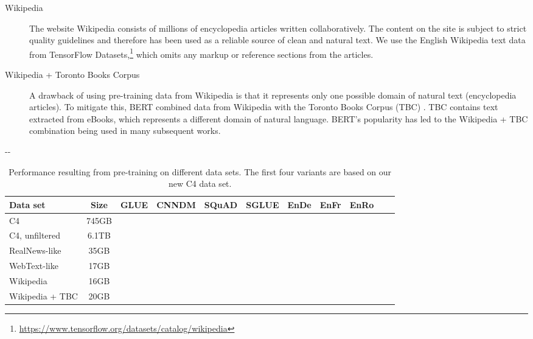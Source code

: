 \documentclass[twoside,11pt]{article}
\newlength{\offsetpage}
\newenvironment{widepage}{\begin{adjustwidth}{-\offsetpage}{-\offsetpage}\addtolength{\textwidth}{2\offsetpage}}{\end{adjustwidth}}
\newcommand{\bsl}{\makebox[0pt][r]{\raisebox{0.05em}{}}}
\begin{document}
\begin{description}
\item[Wikipedia] The website Wikipedia consists of millions of encyclopedia articles written collaboratively.
The content on the site is subject to strict quality guidelines and therefore has been used as a reliable source of clean and natural text.
We use the English Wikipedia text data from TensorFlow Datasets,\footnote{\url{https://www.tensorflow.org/datasets/catalog/wikipedia}} which omits any markup or reference sections from the articles.

\item[Wikipedia + Toronto Books Corpus] A drawback of using pre-training data from Wikipedia is that it represents only one possible domain of natural text (encyclopedia articles).
To mitigate this, BERT \citep{devlin2018bert} combined data from Wikipedia with the Toronto Books Corpus (TBC) \citep{zhu2015aligning}.
TBC contains text extracted from eBooks, which represents a different domain of natural language.
BERT's popularity has led to the Wikipedia + TBC combination being used in many subsequent works.

\end{description}

\begin{table}
\footnotesize
\begin{widepage}
\centering
\begin{tabular}{l c c c c c c c c c c}
\toprule
    Data set         & Size  & GLUE        & CNNDM       & SQuAD       & SGLUE       & EnDe        & EnFr        & EnRo    \\
\midrule
    \bsl C4         & 745GB &      &  &      &      &  &  &  \\
    C4, unfiltered  & 6.1TB &      &      &      &      &      &      &  \\
    RealNews-like   & 35GB  &  &  &      &      &  &  &  \\
    WebText-like    & 17GB  &  &  &  &      &  &  &  \\
    Wikipedia       & 16GB  &      &  &      &      &  &      &  \\
    Wikipedia + TBC & 20GB  &      &  &  &  &  &      &  \\
\bottomrule
\end{tabular}
\end{widepage}
\caption{
Performance resulting from pre-training on different data sets.
The first four variants are based on our new C4 data set.
}
\label{tab:datasets}
\end{table}
\end{document}
